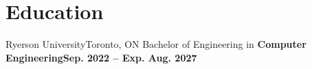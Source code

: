 

\section{Education}
  \resumeSubHeadingListStart
    \resumeSubheading
      {Ryerson University}{Toronto, ON}
      {Bachelor of Engineering in \textbf{Computer Engineering}}{\textbf{Sep. 2022 -- Exp. Aug. 2027}}
      
      \vspace{0.05cm}
      
      
    

    \spaceReducerMini
    
  \resumeSubHeadingListEnd

